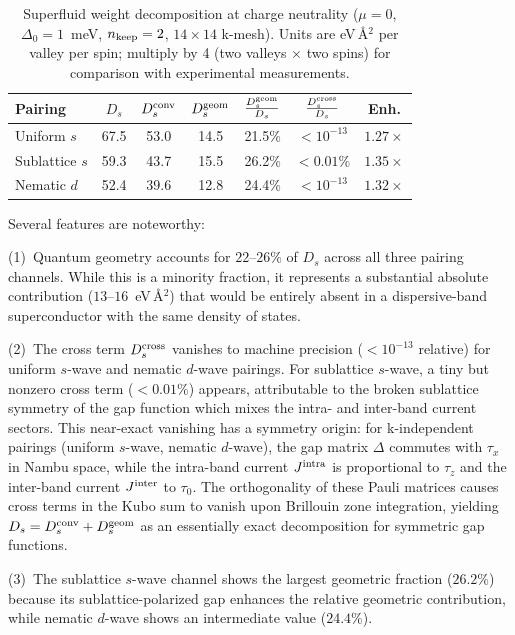 \documentclass[prb,twocolumn,superscriptaddress,floatfix]{revtex4-2}
\begin{document}
\begin{table}[ht]
\centering
\caption{Superfluid weight decomposition at charge neutrality ($\mu = 0$, $\Delta_0 = 1$~meV, $n_{\rm keep} = 2$, $14 \times 14$ k-mesh). Units are eV\,\AA$^2$ per valley per spin; multiply by 4 (two valleys $\times$ two spins) for comparison with experimental measurements.}
\label{tab:cnp}
\begin{tabular}{lcccccc}
\hline\hline
Pairing & $D_s$ & $D_s^{\rm conv}$ & $D_s^{\rm geom}$ & $\frac{D_s^{\rm geom}}{D_s}$ & $\frac{D_s^{\rm cross}}{D_s}$ & Enh. \\
\hline
Uniform $s$ & 67.5 & 53.0 & 14.5 & 21.5\% & $<10^{-13}$ & $1.27\times$ \\
Sublattice $s$ & 59.3 & 43.7 & 15.5 & 26.2\% & $<0.01\%$ & $1.35\times$ \\
Nematic $d$ & 52.4 & 39.6 & 12.8 & 24.4\% & $<10^{-13}$ & $1.32\times$ \\
\hline\hline
\end{tabular}
\end{table}

Several features are noteworthy:

(1)~Quantum geometry accounts for $22$--$26\%$ of $D_s$ across all three pairing channels.
While this is a minority fraction, it represents a substantial absolute contribution ($13$--$16$~eV\,\AA$^2$) that would be entirely absent in a dispersive-band superconductor with the same density of states.

(2)~The cross term $D_s^{\rm cross}$ vanishes to machine precision ($< 10^{-13}$ relative) for uniform $s$-wave and nematic $d$-wave pairings.
For sublattice $s$-wave, a tiny but nonzero cross term ($<0.01\%$) appears, attributable to the broken sublattice symmetry of the gap function which mixes the intra- and inter-band current sectors.
This near-exact vanishing has a symmetry origin: for k-independent pairings (uniform $s$-wave, nematic $d$-wave), the gap matrix $\Delta$ commutes with $\tau_x$ in Nambu space, while the intra-band current $J^{\rm intra}$ is proportional to $\tau_z$ and the inter-band current $J^{\rm inter}$ to $\tau_0$.
The orthogonality of these Pauli matrices causes cross terms in the Kubo sum to vanish upon Brillouin zone integration, yielding $D_s = D_s^{\rm conv} + D_s^{\rm geom}$ as an essentially exact decomposition for symmetric gap functions.

(3)~The sublattice $s$-wave channel shows the largest geometric fraction ($26.2\%$) because its sublattice-polarized gap enhances the relative geometric contribution, while nematic $d$-wave shows an intermediate value ($24.4\%$).
\end{document}

